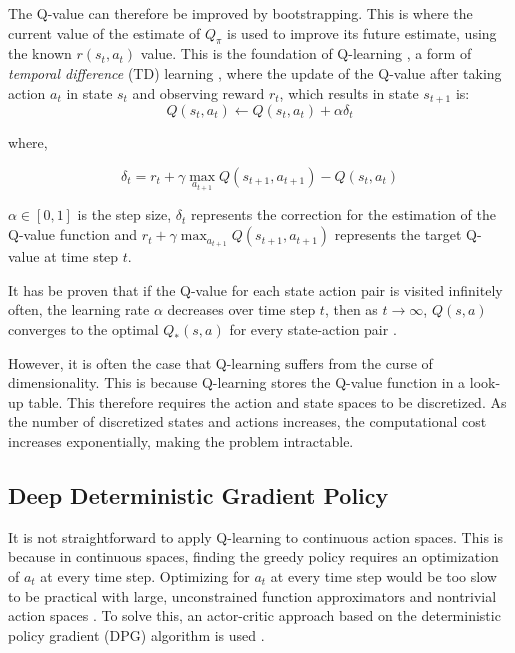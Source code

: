 \documentclass[conference]{IEEEtran}
\begin{document}
\noindent The Q-value can therefore be improved by bootstrapping. This is where the current value of the estimate of $Q_\pi$ is used to improve its future estimate, using the known $r(s_t,a_t)$ value. This is the foundation of Q-learning \cite{Gay2007}, a form of \textit{temporal difference} (TD) learning \cite{Sutton2015}, where the update of the Q-value after taking action $a_t$ in state $s_t$ and observing reward $r_t$, which results in state $s_{t+1}$ is:
\begin{equation}
	Q(s_t,a_t)\leftarrow Q(s_t,a_t)+\alpha\delta_t
\end{equation}

\noindent where,

\begin{equation}
	\delta_t=r_t+\gamma\max_{a_{t+1}}Q(s_{t+1},a_{t+1})-Q(s_{t},a_t)
\end{equation}

\noindent $\alpha\in [0,1]$ is the step size, $\delta_t$ represents the correction for the estimation of the Q-value function and $r_t+\gamma\max_{a_{t+1}}Q(s_{t+1},a_{t+1})$ represents the target Q-value at time step $t$.	


It has be proven that if the Q-value for each state action pair is visited infinitely often, the learning rate $\alpha$ decreases over time step $t$, then as $t\rightarrow \infty$, $Q(s,a)$ converges to the optimal $Q_*(s,a)$ for every state-action pair \cite{Gay2007}.

However, it is often the case that Q-learning suffers from the curse of dimensionality. This is because Q-learning stores the Q-value function in a look-up table. This therefore requires the action and state spaces to be discretized. As the number of discretized states and actions increases, the computational cost increases exponentially, making the problem intractable. 

\subsection{Deep Deterministic Gradient Policy}


It is not straightforward to apply Q-learning to continuous action spaces. This is because in continuous spaces, finding the greedy policy requires an optimization of $a_t$ at every time step. Optimizing for $a_t$ at every time step would be too slow to be practical with large, unconstrained function approximators and nontrivial action spaces \cite{Hunt2016}. To solve this, an actor-critic approach based on the deterministic policy gradient (DPG) algorithm is used \cite{Silver2014}.
\end{document}
